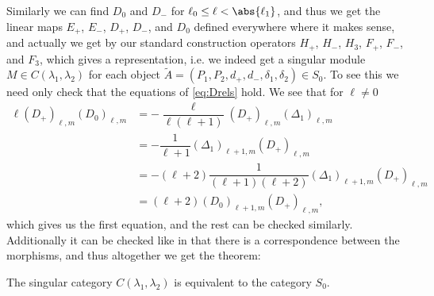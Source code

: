 Similarly we can find $D_0$ and $D_-$ for $\ell_0\leq \ell <\abs{\ell_1}$, and thus we get the linear maps $E_+$, $E_-$, $D_+$, $D_-$, and $D_0$ defined everywhere where it makes sense, and actually we get by our standard construction operators $H_+$, $H_-$, $H_3$, $F_+$, $F_-$, and $F_3$, which gives a representation, i.e. we indeed get a singular module $M\in C(\lambda_1,\lambda_2)$ for each object $\widetilde{A}=(P_1,P_2,d_+,d_-,\delta_1,\delta_2)\in S_0$. To see this we need only check that the equations of \cref{eq:Drels} hold. We see that for $\ell\neq 0$
\begin{align*}
  \ell(D_+)_{\ell,m}(D_0)_{\ell,m} &= -\dfrac{\ell}{\ell(\ell+1)} (D_+)_{\ell,m}(\Delta_1)_{\ell,m} \\
                          &= - \dfrac{1}{\ell+1} (\Delta_1)_{\ell+1,m} (D_+)_{\ell,m} \\
                          &= - (\ell+2)\dfrac{1}{(\ell+1)(\ell+2)} (\Delta_1)_{\ell+1,m} (D_+)_{\ell,m} \\
                          &= (\ell+2)(D_0)_{\ell+1,m}(D_+)_{\ell,m},
\end{align*}
which gives us the first equation, and the rest can be checked similarly. Additionally it can be checked like in  that there is a correspondence between the morphisms, and thus altogether we get the theorem:
\begin{theorem}
  The singular category $C(\lambda_1,\lambda_2)$ is equivalent to the category $S_0$. 
\end{theorem}


